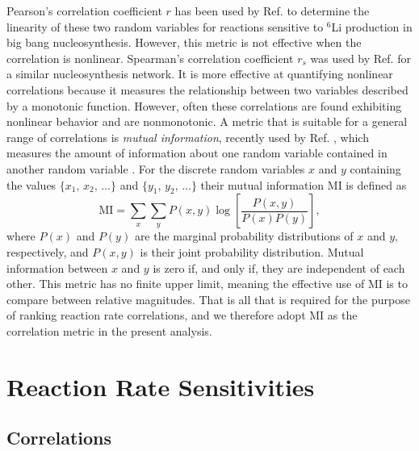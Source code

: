Pearson's correlation coefficient $r$ has been used by Ref. \cite{Coc2014} to determine the linearity of these two random variables for reactions sensitive to $^{6}$Li production in big bang nucleosynthesis. However, this metric is not effective when the correlation is nonlinear. Spearman's correlation coefficient $r_{s}$ was used by Ref. \cite{Iliadis2015b} for a similar nucleosynthesis network. It is more effective at quantifying nonlinear correlations because it measures the relationship between two variables described by a monotonic function. However, often these correlations are found exhibiting nonlinear behavior and are nonmonotonic. A metric that is suitable for a general range of correlations is \emph{mutual information}, recently used by Ref. \cite{Iliadis2020}, which measures the amount of information about one random variable contained in another random variable \cite{Cover2006}. For the discrete random variables $x$ and $y$ containing the values $\{x_{1}, \, x_{2}, \, \ldots\}$ and $\{y_{1}, \, y_{2}, \, \ldots\}$ their mutual information MI is defined as
\begin{equation} \label{eqn:mutual_info}
\mathrm{MI} = \sum_{x} \sum_{y} P(x,y) \log \left[ \frac{P(x,y)}{P(x)P(y)} \right],
\end{equation}
where $P(x)$ and $P(y)$ are the marginal probability distributions of $x$ and $y$, respectively, and $P(x,y)$ is their joint probability distribution. Mutual information between $x$ and $y$ is zero if, and only if, they are independent of each other. This metric has no finite upper limit, meaning the effective use of MI is to compare between relative magnitudes. That is all that is required for the purpose of ranking reaction rate correlations, and we therefore adopt MI as the correlation metric in the present analysis.

\section{Reaction Rate Sensitivities} \label{sec:rate_sensitivities}

\subsection{Correlations} \label{subsec:Corr}

